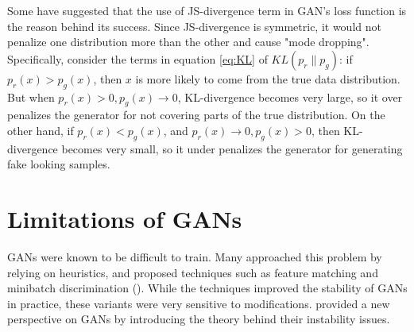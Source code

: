         Some have suggested that the use of JS-divergence term in GAN's loss function is the reason behind its success. Since JS-divergence is symmetric, it would not penalize one distribution more than the other and cause "mode dropping". Specifically, consider the terms in equation \eqref{eq:KL} of $KL(p_r\|p_g)$: if $p_r(x)>p_g(x)$, then $x$ is more likely to come from the true data distribution. But when $p_r(x)>0, p_g(x)\to0$, KL-divergence becomes very large, so it over penalizes the generator for not covering parts of the true distribution. On the other hand, if $p_r(x)<p_g(x)$, and $p_r(x)\to0, p_g(x)>0$, then KL-divergence becomes very small, so it under penalizes the generator for generating fake looking samples.
\section{Limitations of GANs}
GANs were known to be difficult to train. Many approached this problem by relying on heuristics, and proposed techniques such as feature matching and minibatch discrimination (\cite{radford2015unsupervised, salimans2016improved}). While the techniques improved the stability of GANs in practice, these variants were very sensitive to modifications. \cite{arjovsky2017towards} provided a new perspective on GANs by introducing the theory behind their instability issues.

